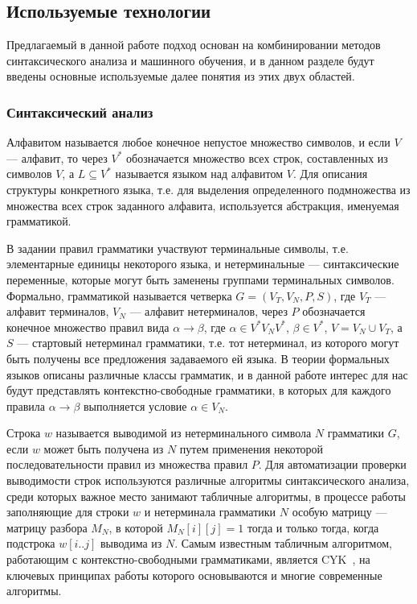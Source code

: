 \subsection{Используемые технологии}
Предлагаемый в данной работе подход основан на комбинировании методов синтаксического анализа и машинного обучения, и в данном разделе будут введены основные используемые далее понятия из этих двух областей.

\subsubsection{Синтаксический анализ}
Алфавитом называется любое конечное непустое множество символов, и если $V$ --- алфавит, то через $V^\ast$ обозначается множество всех строк, составленных из символов $V$, а $L \subseteq V^\ast$  называется языком над алфавитом $V$. Для описания структуры конкретного языка, т.е. для выделения определенного подмножества из множества всех строк заданного алфавита, используется абстракция, именуемая грамматикой.

В задании правил грамматики участвуют терминальные символы, т.е. элементарные единицы некоторого языка, и нетерминальные --- синтаксические переменные, которые могут быть заменены группами терминальных символов. Формально, грамматикой называется четверка $G = (V_T, V_N, P, S)$, где $V_T$ ---  алфавит терминалов, $V_N$ --- алфавит нетерминалов, через $P$ обозначается конечное множество правил вида $\alpha \rightarrow \beta$, где $\alpha \in V^\ast V_N V^\ast$, $\beta \in V^\ast$, $V = V_N \cup V_T$, а $S$ --- стартовый нетерминал грамматики, т.е. тот нетерминал, из которого могут быть получены все предложения задаваемого ей языка. В теории формальных языков описаны различные классы грамматик, и в данной работе интерес для нас будут представлять контекстно-свободные грамматики, в которых для каждого правила $\alpha \rightarrow \beta$ выполняется условие $\alpha \in V_N$.

Строка $w$ называется выводимой из нетерминального символа $N$ грамматики $G$, если $w$ может быть получена из $N$ путем применения некоторой последовательности правил из множества правил $P$. Для автоматизации проверки выводимости строк используются различные алгоритмы синтаксического анализа, среди которых важное место занимают табличные алгоритмы, в процессе работы заполняющие для строки $w$ и нетерминала грамматики $N$ особую матрицу --- матрицу разбора $M_N$, в которой $M_N[i][j] = 1$ тогда и только тогда, когда подстрока $w[i..j]$ выводима из $N$. Самым известным табличным алгоритмом, работающим с контекстно-свободными грамматиками, является CYK~\cite{cocke1969programming,younger1967recognition,kasami1966efficient}, на ключевых принципах работы которого основываются и многие современные алгоритмы.

